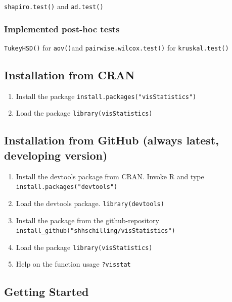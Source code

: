 \documentclass[
]{article}
\providecommand{\tightlist}{%
  \setlength{\itemsep}{0pt}\setlength{\parskip}{0pt}}
\begin{document}
\texttt{shapiro.test()} and \texttt{ad.test()}

\hypertarget{implemented-post-hoc-tests}{%
\subsubsection{Implemented post-hoc
tests}\label{implemented-post-hoc-tests}}

\texttt{TukeyHSD()} for \texttt{aov()}and
\texttt{pairwise.wilcox.test()} for \texttt{kruskal.test()}

\hypertarget{installation-from-cran}{%
\subsection{Installation from CRAN}\label{installation-from-cran}}

\begin{enumerate}
\def\labelenumi{\arabic{enumi}.}
\tightlist
\item
  Install the package \texttt{install.packages("visStatistics")}
\item
  Load the package \texttt{library(visStatistics)}
\end{enumerate}

\hypertarget{installation-from-github-always-latest-developing-version}{%
\subsection{Installation from GitHub (always latest, developing
version)}\label{installation-from-github-always-latest-developing-version}}

\begin{enumerate}
\def\labelenumi{\arabic{enumi}.}
\tightlist
\item
  Install the devtools package from CRAN. Invoke R and type
  \texttt{install.packages("devtools")}
\item
  Load the devtools package. \texttt{library(devtools)}
\item
  Install the package from the github-repository
  \texttt{install\_github("shhschilling/visStatistics")}
\item
  Load the package \texttt{library(visStatistics)}
\item
  Help on the function usage \texttt{?visstat}
\end{enumerate}

\hypertarget{getting-started}{%
\subsection{Getting Started}\label{getting-started}}
\end{document}
